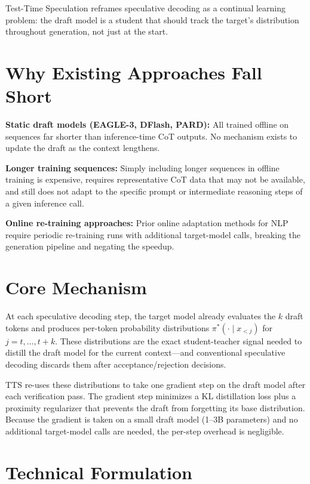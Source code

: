 \documentclass[10pt,twocolumn]{article}
\begin{document}
Test-Time Speculation reframes speculative decoding as a continual learning
problem: the draft model is a student that should track the target's
distribution throughout generation, not just at the start.

\section{Why Existing Approaches Fall Short}

\textbf{Static draft models (EAGLE-3, DFlash, PARD):}
All trained offline on sequences far shorter than inference-time CoT outputs.
No mechanism exists to update the draft as the context lengthens.

\textbf{Longer training sequences:}
Simply including longer sequences in offline training is expensive, requires
representative CoT data that may not be available, and still does not adapt to
the specific prompt or intermediate reasoning steps of a given inference call.

\textbf{Online re-training approaches:}
Prior online adaptation methods for NLP require periodic re-training runs with
additional target-model calls, breaking the generation pipeline and negating
the speedup.

\section{Core Mechanism}

At each speculative decoding step, the target model already evaluates the
$k$ draft tokens and produces per-token probability distributions
$\pi^*(\cdot \mid x_{<j})$ for $j = t, \ldots, t+k$. These distributions are
the exact student-teacher signal needed to distill the draft model for the
current context---and conventional speculative decoding discards them after
acceptance/rejection decisions.

TTS re-uses these distributions to take one gradient step on the draft model
after each verification pass. The gradient step minimizes a KL distillation
loss plus a proximity regularizer that prevents the draft from forgetting its
base distribution. Because the gradient is taken on a small draft model
(1--3B parameters) and no additional target-model calls are needed, the
per-step overhead is negligible.

\section{Technical Formulation}
\end{document}
